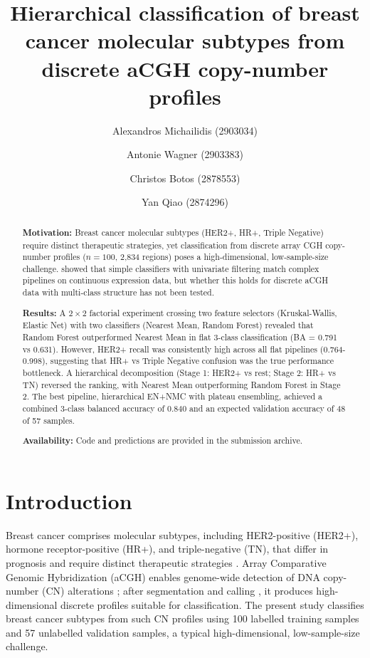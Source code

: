 \documentclass[11pt,a4paper,twocolumn]{article}
\title{Hierarchical classification of breast cancer molecular subtypes
       from discrete aCGH copy-number profiles}
\author[1]{Alexandros Michailidis (2903034)}
\author[2]{Antonie Wagner (2903383)}
\author[1]{Christos Botos (2878553)}
\author[1]{Yan Qiao (2874296)}
\affil[1]{Bioinformatics and Systems Biology Master's Programme, Vrije Universiteit Amsterdam, The Netherlands}
\affil[2]{Computer Science Master's Programme, Vrije Universiteit Amsterdam, The Netherlands}
\date{}
\begin{document}
\maketitle

\begin{abstract}
\noindent
\textbf{Motivation:}
Breast cancer molecular subtypes (HER2+, HR+, Triple Negative) require distinct therapeutic strategies, yet classification from discrete array CGH copy-number profiles ($n = 100$, 2,834 regions) poses a high-dimensional, low-sample-size challenge. \citet{wessels2005protocol} showed that simple classifiers with univariate filtering match complex pipelines on continuous expression data, but whether this holds for discrete aCGH data with multi-class structure has not been tested.

\textbf{Results:}
A $2 \times 2$ factorial experiment crossing two feature selectors (Kruskal-Wallis, Elastic Net) with two classifiers (Nearest Mean, Random Forest) revealed that Random Forest outperformed Nearest Mean in flat 3-class classification (BA = 0.791 vs 0.631). However, HER2+ recall was consistently high across all flat pipelines (0.764-0.998), suggesting that HR+ vs Triple Negative confusion was the true performance bottleneck. A hierarchical decomposition (Stage 1: HER2+ vs rest; Stage 2: HR+ vs TN) reversed the ranking, with Nearest Mean outperforming Random Forest in Stage 2. The best pipeline, hierarchical EN+NMC with plateau ensembling, achieved a combined 3-class balanced accuracy of 0.840 and an expected validation accuracy of 48 of 57 samples.

\textbf{Availability:}
Code and predictions are provided in the submission archive.
\end{abstract}

\section{Introduction}
\label{sec:introduction}

Breast cancer comprises molecular subtypes, including HER2-positive (HER2+), hormone receptor-positive (HR+), and triple-negative (TN), that differ in prognosis and require distinct therapeutic strategies \citep{perou2000molecular, sorlie2001gene}. Array Comparative Genomic Hybridization (aCGH) enables genome-wide detection of DNA copy-number (CN) alterations \citep{pinkel2005array}; after segmentation and calling \citep{venkatraman2007cbs, vandewiel2007cghcall, vandewiel2011preprocessing}, it produces high-dimensional discrete profiles suitable for classification. The present study classifies breast cancer subtypes from such CN profiles using 100 labelled training samples and 57 unlabelled validation samples, a typical high-dimensional, low-sample-size challenge.
\end{document}
